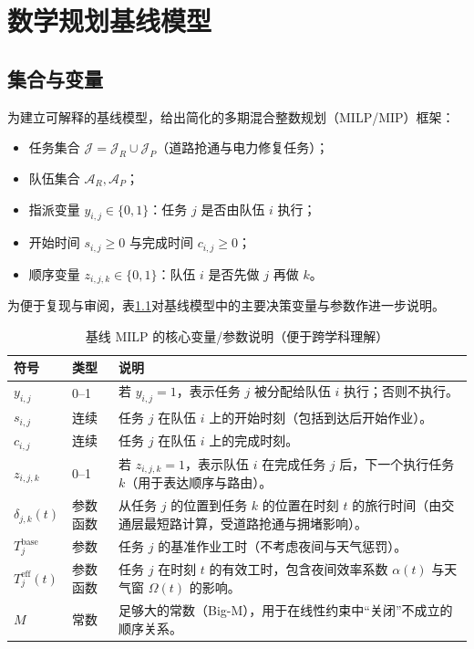 \documentclass[UTF8,zihao=-4,a4paper,fontset=fandol]{ctexrep}
\begin{document}
\chapter{数学规划基线模型}\label{ch:milp}
\section{集合与变量}
为建立可解释的基线模型，给出简化的多期混合整数规划（MILP/MIP）框架：
\begin{itemize}[leftmargin=2em]
  \item 任务集合 $\mathcal{J}=\mathcal{J}_R\cup\mathcal{J}_P$（道路抢通与电力修复任务）；
  \item 队伍集合 $\mathcal{A}_R,\mathcal{A}_P$；
  \item 指派变量 $y_{i,j}\in\{0,1\}$：任务 $j$ 是否由队伍 $i$ 执行；
  \item 开始时间 $s_{i,j}\ge 0$ 与完成时间 $c_{i,j}\ge 0$；
  \item 顺序变量 $z_{i,j,k}\in\{0,1\}$：队伍 $i$ 是否先做 $j$ 再做 $k$。
\end{itemize}

为便于复现与审阅，表\ref{tab:milp_vars}对基线模型中的主要决策变量与参数作进一步说明。

\begin{table}[H]
\centering
\caption{基线 MILP 的核心变量/参数说明（便于跨学科理解）}
\label{tab:milp_vars}
\begin{tabularx}{0.98\textwidth}{l l X}
\toprule
\textbf{符号} & \textbf{类型} & \textbf{说明}\\
\midrule
$y_{i,j}$ & 0--1 & 若 $y_{i,j}=1$，表示任务 $j$ 被分配给队伍 $i$ 执行；否则不执行。\\
$s_{i,j}$ & 连续 & 任务 $j$ 在队伍 $i$ 上的开始时刻（包括到达后开始作业）。\\
$c_{i,j}$ & 连续 & 任务 $j$ 在队伍 $i$ 上的完成时刻。\\
$z_{i,j,k}$ & 0--1 & 若 $z_{i,j,k}=1$，表示队伍 $i$ 在完成任务 $j$ 后，下一个执行任务 $k$（用于表达顺序与路由）。\\
$\delta_{j,k}(t)$ & 参数函数 & 从任务 $j$ 的位置到任务 $k$ 的位置在时刻 $t$ 的旅行时间（由交通层最短路计算，受道路抢通与拥堵影响）。\\
$T_j^{\text{base}}$ & 参数 & 任务 $j$ 的基准作业工时（不考虑夜间与天气惩罚）。\\
$T_j^{\text{eff}}(t)$ & 参数函数 & 任务 $j$ 在时刻 $t$ 的有效工时，包含夜间效率系数 $\alpha(t)$ 与天气窗 $\Omega(t)$ 的影响。\\
$M$ & 常数 & 足够大的常数（Big-M），用于在线性约束中“关闭”不成立的顺序关系。\\
\bottomrule
\end{tabularx}
\end{table}
\end{document}

